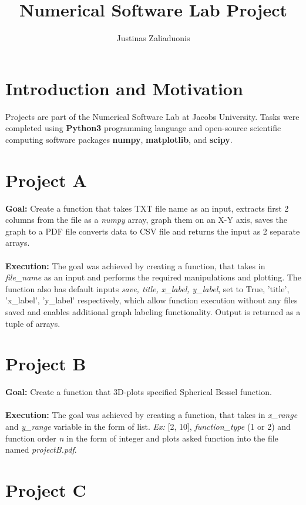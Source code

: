 \documentclass[a4paper,12pt]{article}
\begin{document}
\title{Numerical Software Lab Project}
\author{Justinas Zaliaduonis}
\maketitle


\section{Introduction and Motivation}

Projects are part of the Numerical Software Lab at Jacobs University. Tasks were completed using \textbf{Python3} programming language and open-source scientific computing software packages \textbf{numpy}, \textbf{matplotlib}, and \textbf{scipy}.

\section{Project A}
\textbf{Goal:} Create a function that takes TXT file name as an input, extracts first 2 columns from the file as a \textit{numpy} array, graph them on an X-Y axis, saves the graph to a PDF file converts data to CSV file and returns the input as 2 separate arrays. \\ \\ \textbf{Execution: } The goal was achieved by creating a function, that takes in \textit{file\_name} as an input and performs the required manipulations and plotting. The function also has default inputs \textit{save, title, x\_label, y\_label}, set to True, 'title', 'x\_label', 'y\_label' respectively, which allow function execution without any files saved and enables additional graph labeling functionality. Output is returned as a tuple of arrays.

\section{Project B}

\textbf{Goal:} Create a function that 3D-plots specified Spherical Bessel function. \\ \\ \textbf{Execution:} The goal was achieved by creating a function, that takes in \textit{x\_range} and \textit{y\_range} variable in the form of list. \textit{Ex:} [2, 10], \textit{function\_type} (1 or 2) and function order \textit{n} in the form of integer and plots asked function into the file named \textit{projectB.pdf}.


\section{Project C}
\end{document}

